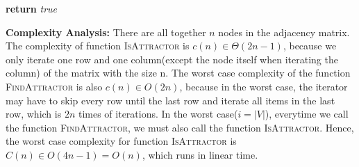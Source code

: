 \documentclass[11pt]{article}
\begin{document}
\begin{enumerate}
\begin{enumerate}
\begin{algorithmic}[1]
			\EndIf
		\EndIf
	\EndFor
		\State \textbf{return} \emph{true}
\EndFunction
\end{algorithmic}
\textbf{Complexity Analysis:} There are all together $n$ nodes in the adjacency matrix. 
The complexity of function \textsc{IsAttractor} is $c(n)\in \Theta(2n-1)$, 
because we only iterate one row and one column(except the node itself when iterating the column) 
of the matrix with the size n. The worst case complexity of the function \textsc{FindAttractor} 
is also $c(n)\in O(2n)$, because in the worst case, 
the iterator may have to skip every row until the last row and iterate all items in the last row,
which is $2n$ times of iterations. In the worst case($i=|V|$), 
everytime we call the function \textsc{FindAttractor}, 
we must also call the function \textsc{IsAttractor}. 
Hence, the worst case complexity for function \textsc{IsAttractor} is $C(n)\in O(4n-1)=O(n)$, 
which runs in linear time.
\end{enumerate}

\end{enumerate}
\end{document}
